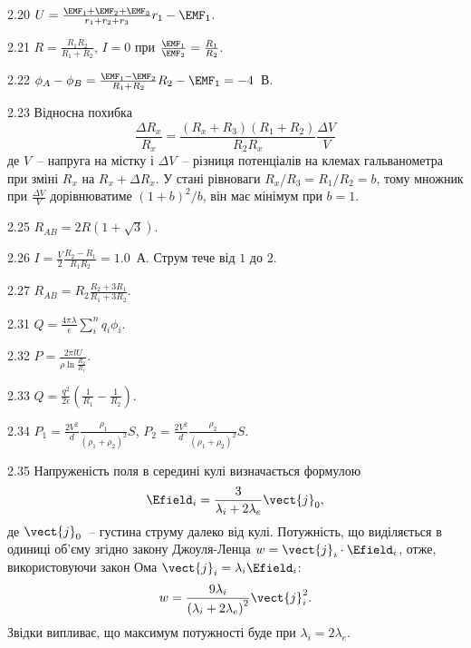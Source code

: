\begin{Solution}{2.{20}}
	$U = \frac{\EMF_1+\EMF_2+\EMF_3}{r_1 + r_2 + r_3} r_1 - \EMF_1$.
\end{Solution}
\begin{Solution}{2.{21}}
	$R = \frac{R_1R_2}{R_1 + R_2}$, $I = 0$ при $\frac{\EMF_1}{\EMF_2} = \frac{R_1}{R_2}$.
\end{Solution}
\begin{Solution}{2.{22}}
	$\phi_A - \phi_B = \frac{\EMF_1 - \EMF_2}{R_1 + R_2} R_2 - \EMF_1 =-4$~В.
\end{Solution}
\begin{Solution}{2.{23}}
	Відносна похибка
	\[
		\frac{\Delta R_x}{R_x} = \frac{(R_x + R_3)(R_1 + R_2)}{R_2 R_x}\frac{\Delta V}{V}
	\]
	де $V$~-- напруга на містку і $\Delta V$~-- різниця потенціалів на клемах гальванометра при зміні $R_x$ на $R_x + \Delta R_x$. У стані рівноваги $R_x / R_3 = R_1 / R_2 = b$, тому множник при $\frac{\Delta V}{V}$ дорівнюватиме $(1+b)^2/b$, він має мінімум при $b = 1$.
\end{Solution}
\begin{Solution}{2.{25}}
	$R_{AB} = 2R (1 + \sqrt{3})$.
\end{Solution}
\begin{Solution}{2.{26}}
	$I = \frac{V}{2}\frac{R_2 - R_1}{R_1R_2} = 1.0$~А. Струм тече від $1$ до $2$.
\end{Solution}
\begin{Solution}{2.{27}}
	$R_{AB}  = R_2 \frac{R_2 + 3R_1}{R_1 + 3R_2}$.
\end{Solution}
\begin{Solution}{2.{31}}
	$Q = \frac{4\pi\lambda}{\epsilon}\sum\limits_i^n q_i\phi_i$.
\end{Solution}
\begin{Solution}{2.{32}}
	$P = \frac{2\pi l U}{\rho\ln\frac{R_2}{R_1}}$.
\end{Solution}
\begin{Solution}{2.{33}}
	$Q = \frac{q^2}{2\epsilon}\left( \frac{1}{R_1} - \frac{1}{R_2}\right) $.
\end{Solution}
\begin{Solution}{2.{34}}
	$P_1  = \frac{2V^2}{d} \frac{\rho_1}{(\rho_1 + \rho_2)^2}S$, $P_2  = \frac{2V^2}{d} \frac{\rho_2}{(\rho_1 + \rho_2)^2}S$.
\end{Solution}
\begin{Solution}{2.{35}}
	Напруженість поля в середині кулі визначається формулою
	\[
		\Efield_i = \frac{3}{\lambda_i + 2\lambda_e} \vect{j}_0,
	\]
	де $\vect{j}_0$~-- густина струму далеко від кулі.
	Потужність, що виділяється в одиниці об'єму згідно закону Джоуля-Ленца $w = \vect{j}_i\cdot\Efield_i$, отже, використовуючи закон Ома $ \vect{j}_i = \lambda_i\Efield_i$:
	\[
		w = \frac{9\lambda_i}{\left( \lambda_i + 2\lambda_e\right)^2} \vect{j}_i^2.
	\]
	Звідки випливає, що максимум потужності буде при $\lambda_i = 2\lambda_e$.
\end{Solution}
